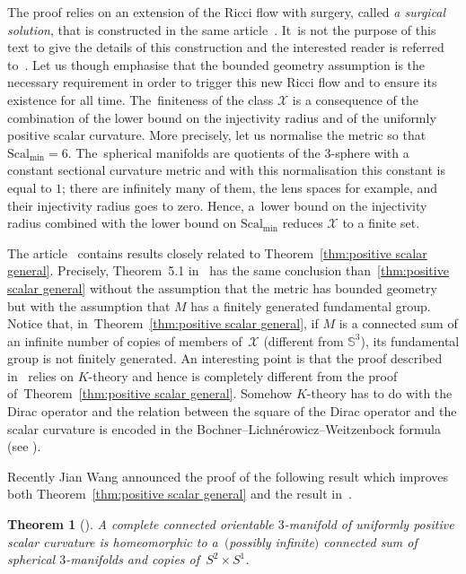\documentclass[10pt,a4paper]{amsart}
\numberwithin{equation}{section}
\newtheorem{theor}{Theorem}[section]
\def\Smin{\textrm{Scal}_\mathrm{min}}
\begin{document}
The proof relies on an extension of the Ricci flow with surgery, called {\it a surgical solution}, that is constructed in the same article~\cite{BBM}. It~is not the purpose of this text to give the details of this construction and the interested reader is referred to~\cite{BBM}. Let us though emphasise that the bounded geometry assumption is the necessary requirement in order to trigger this new Ricci flow and to ensure its existence for all time. The~finiteness of the class $\mathcal X$ is a consequence
of the combination of the lower bound on the injectivity radius and of the uniformly positive scalar curvature. More precisely, let us normalise the metric so that $\Smin = 6$. The~spherical manifolds are quotients of the $3$-sphere with a constant sectional curvature metric and with this
normalisation this constant is equal to $1$; there are infinitely many of
them, the lens spaces for example, and their injectivity radius goes to zero. Hence, a~lower bound on the injectivity radius combined with the lower bound on $\Smin$ reduces $\mathcal X$ to a finite set.

The article~\cite{cwy:taming} contains results closely related to Theorem~\ref{thm:positive scalar general}. Precisely, Theorem~5.1 in~\cite{cwy:taming} has the same conclusion than~\ref{thm:positive scalar general} without the assumption that the metric has bounded geometry but with the assumption that $M$ has a finitely generated fundamental group. Notice that, in~Theorem~\ref{thm:positive scalar general}, if $M$ is a connected sum of
an infinite number of copies of members of~$\mathcal X$ (different from $\mathbb{S}^3$), its fundamental group is not finitely generated. An interesting point is that the proof described in~\cite{cwy:taming} relies on $K$-theory and hence is completely different from the proof of~Theorem~\ref{thm:positive scalar general}. Somehow $K$-theory has to do with the Dirac operator and the relation between the square of the Dirac operator and
the scalar curvature is encoded in the Bochner--Lichn\'erowicz--Weitzenbock formula (see \cite[equation~(2.14), p.~112]{GromovLawson}).

Recently Jian Wang announced the proof of the following result which improves both Theorem~\ref{thm:positive scalar general} and the result in~\cite{cwy:taming}.

\begin{theor}[\cite{Wang3}]\label{Wang3}
A complete connected orientable $3$-manifold of uniformly positive scalar
curvature is homeomorphic to a~$($possibly infinite$)$ connected sum of spherical $3$-manifolds and copies of~$S^2\times S^1$.
\end{theor}
\end{document}
